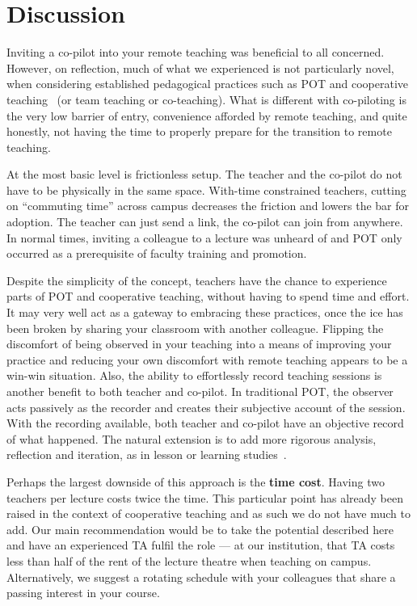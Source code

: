\documentclass[sigconf,natbib=false]{acmart}
\begin{document}
\section{Discussion}

Inviting a co-pilot into your remote teaching was beneficial to all concerned. 
However, on reflection, much of what we experienced is not particularly novel, 
when considering established pedagogical practices such as \ac{POT} and 
cooperative teaching~\cite{bauwens1995cooperative} (or team teaching or 
co-teaching). What is different with co-piloting is the very low barrier of 
entry, convenience afforded by remote teaching, and quite honestly, not having 
the time to properly prepare for the transition to remote teaching.

At the most basic level is frictionless setup. The teacher and the co-pilot do 
not have to be physically in the same space. With-time constrained teachers, 
cutting on \enquote{commuting time} across campus decreases the friction and 
lowers the bar for adoption. The teacher can just send a link, the co-pilot can 
join from anywhere. In normal times, inviting a colleague to a lecture was 
unheard of and \ac{POT} only occurred as a prerequisite of faculty training and 
promotion.

Despite the simplicity of the concept, teachers have the chance to experience 
parts of \ac{POT} and cooperative teaching, without having to spend time and 
effort. It may very well act as a gateway to embracing these practices, once 
the ice has been broken by sharing your classroom with another colleague. 
Flipping the discomfort of being observed in your teaching into a means of 
improving your practice and reducing your own discomfort with remote teaching 
appears to be a win-win situation. Also, the ability to effortlessly record 
teaching sessions is another benefit to both teacher and co-pilot. In 
traditional \ac{POT}, the observer acts passively as the recorder and creates 
their subjective account of the session. With the recording available, both 
teacher and co-pilot have an objective record of what happened. The natural 
extension is to add more rigorous analysis, reflection and iteration, as in 
lesson or learning studies~\cite{NecessaryConditionsOfLearning}.

Perhaps the largest downside of this approach is the \textbf{time cost}. Having 
two teachers per lecture costs twice the time. This particular point has 
already been raised in the context of cooperative teaching and as such we do 
not have much to add. Our main recommendation would be to take the potential 
described here and have an experienced \ac{TA} fulfil the role --- at our 
institution, that \ac{TA} costs less than half of the rent of the lecture 
theatre when teaching on campus.
Alternatively, we suggest a rotating schedule with your colleagues that share a 
passing interest in your course.
\end{document}
